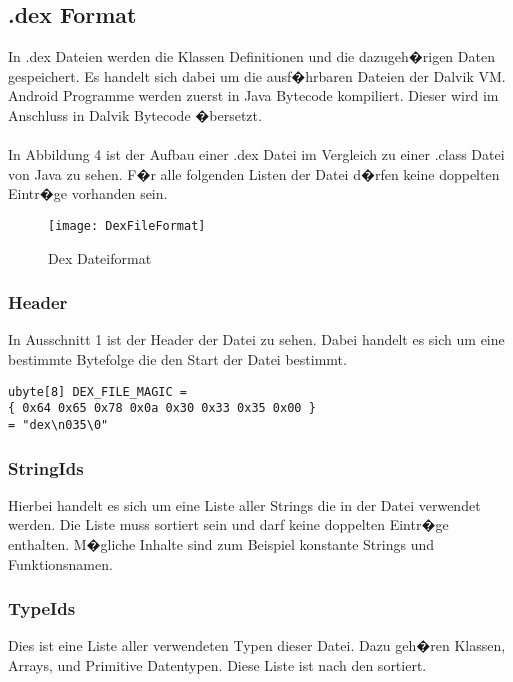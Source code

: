 \documentclass[11pt,conference,a4paper]{IEEEtran}
\begin{document}
\subsection{.dex Format}
In .dex Dateien werden die Klassen Definitionen und die dazugeh�rigen Daten gespeichert. Es handelt sich dabei um die ausf�hrbaren Dateien der Dalvik VM. Android Programme werden zuerst in Java Bytecode kompiliert. Dieser wird im Anschluss in Dalvik Bytecode �bersetzt. 
\\
\\
In Abbildung 4 ist der Aufbau einer .dex Datei im Vergleich zu einer .class Datei von Java zu sehen. F�r alle folgenden Listen der Datei d�rfen keine doppelten Eintr�ge vorhanden sein.

\begin{figure}
\centering
\texttt{[image: DexFileFormat]}
\caption{Dex Dateiformat\cite{1}}
\label{fig:DexFileFormat}
\end{figure}

\subsubsection{Header}
In Ausschnitt 1 ist der Header der  Datei zu sehen. Dabei handelt es sich um eine bestimmte Bytefolge die den Start der Datei bestimmt.

\begin{lstlisting}[float,floatplacement=H,caption=Dex Header\cite{2}]
ubyte[8] DEX_FILE_MAGIC = 
{ 0x64 0x65 0x78 0x0a 0x30 0x33 0x35 0x00 } 
= "dex\n035\0"

\end{lstlisting}

\subsubsection{StringIds}
Hierbei handelt es sich um eine Liste aller Strings die in der Datei verwendet werden. Die Liste muss sortiert sein und darf keine doppelten Eintr�ge enthalten. M�gliche Inhalte sind zum Beispiel konstante Strings und Funktionsnamen.

\subsubsection{TypeIds}
Dies ist eine Liste aller verwendeten Typen dieser Datei. Dazu geh�ren Klassen, Arrays, und Primitive Datentypen. Diese Liste ist nach den  sortiert.
\end{document}
